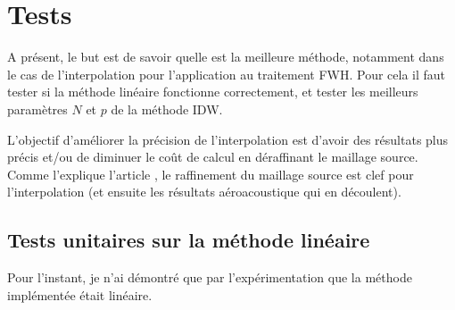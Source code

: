 

\section{Tests}
A présent, le but est de savoir quelle est la meilleure méthode, notamment dans le cas de l'interpolation pour l'application au traitement FWH. Pour cela il faut tester si la méthode linéaire fonctionne correctement, et tester les meilleurs paramètres \(N\) et \(p\) de la méthode IDW.


L'objectif d'améliorer la précision de l'interpolation est d'avoir des résultats plus précis et/ou de diminuer le coût de calcul en déraffinant le maillage source.
Comme l'explique l'article \cite{schoder2019}, le raffinement du maillage source est clef pour l'interpolation (et ensuite les résultats aéroacoustique qui en découlent).

\subsection{Tests unitaires sur la méthode linéaire}

Pour l'instant, je n'ai démontré que par l'expérimentation que la méthode implémentée était linéaire.

